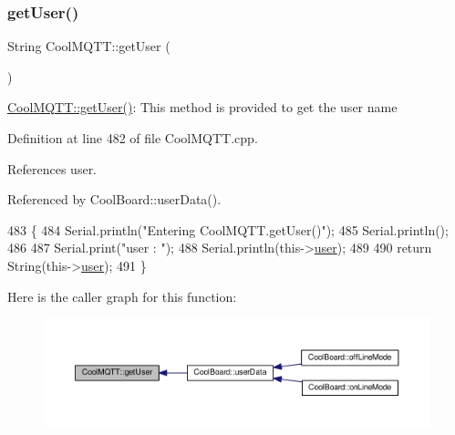 \mbox{\label{classCoolMQTT_a373cc92fca7760d886f02d8a6e5b3f63}} 
\subsubsection{\texorpdfstring{get\+User()}{getUser()}}
{\footnotesize\ttfamily String Cool\+M\+Q\+T\+T\+::get\+User (\begin{DoxyParamCaption}{ }\end{DoxyParamCaption})}

\hyperlink{classCoolMQTT_a373cc92fca7760d886f02d8a6e5b3f63}{Cool\+M\+Q\+T\+T\+::get\+User()}\+: This method is provided to get the user name 

Definition at line 482 of file Cool\+M\+Q\+T\+T.\+cpp.



References user.



Referenced by Cool\+Board\+::user\+Data().


\begin{DoxyCode}
483 \{
484     Serial.println(\textcolor{stringliteral}{"Entering CoolMQTT.getUser()"});
485     Serial.println();
486     
487     Serial.print(\textcolor{stringliteral}{"user : "});
488     Serial.println(this->\hyperlink{classCoolMQTT_a8cd47e45d457f908d4b4390b35aaee83}{user});
489 
490     \textcolor{keywordflow}{return} String(this->\hyperlink{classCoolMQTT_a8cd47e45d457f908d4b4390b35aaee83}{user});
491 \}
\end{DoxyCode}
Here is the caller graph for this function\+:
\nopagebreak
\begin{figure}[H]
\begin{center}
\leavevmode
\includegraphics[width=350pt]{classCoolMQTT_a373cc92fca7760d886f02d8a6e5b3f63_icgraph}
\end{center}
\end{figure}
\mbox{\label{classCoolMQTT_aa5eaae967b562b62cbcf2b8d81f6e5d5}} 

